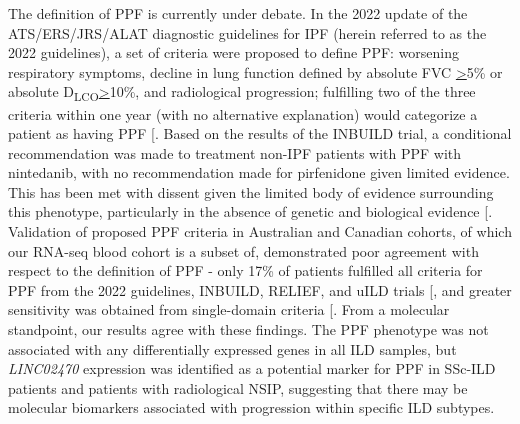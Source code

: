 \documentclass[
]{article}
\begin{document}
The definition of PPF is currently under debate. In the 2022 update of the ATS/ERS/JRS/ALAT diagnostic guidelines for IPF (herein referred to as the 2022 guidelines), a set of criteria were proposed to define PPF: worsening respiratory symptoms, decline in lung function defined by absolute FVC \underline{>}5\% or absolute D\textsubscript{LCO}\underline{>}10\%, and radiological progression; fulfilling two of the three criteria within one year (with no alternative explanation) would categorize a patient as having PPF {[}\citeproc{ref-raghu_idiopathic_2022}{2}{]}. Based on the results of the INBUILD trial, a conditional recommendation was made to treatment non-IPF patients with PPF with nintedanib, with no recommendation made for pirfenidone given limited evidence. This has been met with dissent given the limited body of evidence surrounding this phenotype, particularly in the absence of genetic and biological evidence {[}\citeproc{ref-johannson_progressive_2022}{138}{]}. Validation of proposed PPF criteria in Australian and Canadian cohorts, of which our RNA-seq blood cohort is a subset of, demonstrated poor agreement with respect to the definition of PPF - only 17\% of patients fulfilled all criteria for PPF from the 2022 guidelines, INBUILD, RELIEF, and uILD trials {[}\citeproc{ref-khor_patient_2023}{22}{]}, and greater sensitivity was obtained from single-domain criteria {[}\citeproc{ref-pugashetti_validation_2023}{140}{]}. From a molecular standpoint, our results agree with these findings. The PPF phenotype was not associated with any differentially expressed genes in all ILD samples, but \textit{LINC02470} expression was identified as a potential marker for PPF in SSc-ILD patients and patients with radiological NSIP, suggesting that there may be molecular biomarkers associated with progression within specific ILD subtypes.
\end{document}
